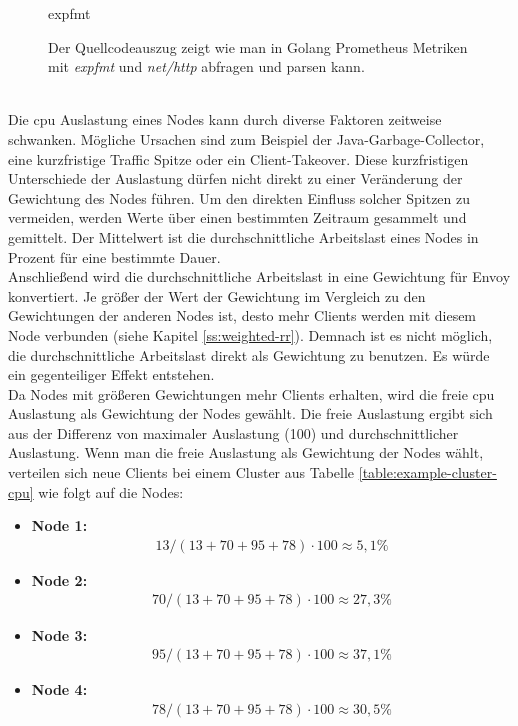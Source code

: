 \begin{figure}
    {expfmt}
    \caption{Der Quellcodeauszug zeigt wie man in Golang Prometheus Metriken mit \textit{expfmt} und \textit{net/http} abfragen und parsen kann.}
    \label{code:expfmt}
\end{figure}
\\
Die \ac{cpu} Auslastung eines Nodes kann durch diverse Faktoren zeitweise schwanken. Mögliche Ursachen sind zum Beispiel der Java-Garbage-Collector, eine kurzfristige Traffic Spitze oder ein Client-Takeover.
Diese kurzfristigen Unterschiede der Auslastung dürfen nicht direkt zu einer Veränderung der Gewichtung des Nodes führen.
Um den direkten Einfluss solcher Spitzen zu vermeiden, werden Werte über einen bestimmten Zeitraum gesammelt und gemittelt. Der Mittelwert ist die durchschnittliche Arbeitslast eines Nodes in Prozent für eine bestimmte Dauer.
\\
Anschlie{\ss}end wird die durchschnittliche Arbeitslast in eine Gewichtung für Envoy konvertiert.
Je grö{\ss}er der Wert der Gewichtung im Vergleich zu den Gewichtungen der anderen Nodes ist, desto mehr Clients werden mit diesem Node verbunden (siehe Kapitel \ref{ss:weighted-rr}).
Demnach ist es nicht möglich, die durchschnittliche Arbeitslast direkt als Gewichtung zu benutzen. Es würde ein gegenteiliger Effekt entstehen.
\\
Da Nodes mit grö{\ss}eren Gewichtungen mehr Clients erhalten, wird die freie \ac{cpu} Auslastung als Gewichtung der Nodes gewählt.
Die freie Auslastung ergibt sich aus der Differenz von maximaler Auslastung (100) und durchschnittlicher Auslastung.
Wenn man die freie Auslastung als Gewichtung der Nodes wählt, verteilen sich neue Clients bei einem Cluster aus Tabelle \ref{table:example-cluster-cpu} wie folgt auf die Nodes:
\begin{itemize}
  \item \textbf{Node 1:}
    \begin{align}
      13 / (13 + 70 + 95 + 78) \cdot 100 \approx 5,1 \%
    \end{align}
  \item \textbf{Node 2:}
    \begin{align}
      70 / (13 + 70 + 95 + 78) \cdot 100 \approx 27,3 \%
    \end{align}
  \item \textbf{Node 3:}
    \begin{align}
      95 / (13 + 70 + 95 + 78) \cdot 100 \approx 37,1 \%
    \end{align}
  \item \textbf{Node 4:}
    \begin{align}
      78 / (13 + 70 + 95 + 78) \cdot 100 \approx 30,5 \%
    \end{align}
\end{itemize}
